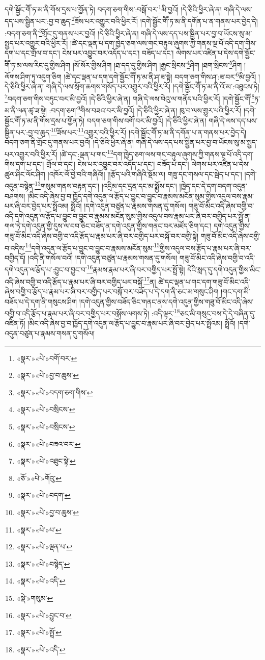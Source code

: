 དགེ་སྦྱོང་གཽ་ཏ་མ་ནི་གོས་དྲས་པ་གྱོན་ཏེ། བདག་ཅག་གིས་:བསྒོ་བར་\footnote{«སྣར་»«པེ་»བགོ་བར་}མི་བྱའོ། །དེ་ཅིའི་ཕྱིར་ཞེ་ན། གཞི་དེ་ལས་དད་པས་སྦྱིན་པར་:བྱ་བ་ཆུད་\footnote{«སྣར་»«པེ་»བྱ་བ་ཆུས་}ཟོས་པར་འགྱུར་བའི་ཕྱིར་རོ། །དགེ་སྦྱོང་གཽ་ཏ་མ་ནི་དགོན་པ་ན་གནས་པར་བྱེད་དེ། :བདག་ཅག་ནི་\footnote{«སྣར་»«པེ་»བདག་ཅག་གིས་}གྲོང་དུ་གནས་པར་བྱའོ། །དེ་ཅིའི་ཕྱིར་ཞེ་ན། གཞི་དེ་ལས་དད་པས་སྦྱིན་པར་བྱ་བ་ཡོངས་སུ་མ་སྤྱད་པར་འགྱུར་བའི་ཕྱིར་རོ། །ཚེ་དང་ལྡན་པ་དག་ཁྱེད་ཅག་ལས་གང་བརྟུལ་ཞུགས་ཀྱི་གནས་ལྔ་པོ་འདི་དག་གིས་དག་པ་དང་གྲོལ་བ་དང་། ངེས་པར་འབྱུང་བར་འདོད་པ་དང་། བཟོད་པ་དང་། ལེགས་པར་འཛིན་པ་དེས་དགེ་སྦྱོང་གཽ་ཏ་མ་ལས་རིང་དུ་གྱིས་ཤིག །སོ་སོར་གྱིས་ཤིག །ཐ་དད་དུ་གྱིས་ཤིག །རྒྱང་སྲིངས་\footnote{«སྣར་»«པེ་»བསྲིངས་}ཤིག །ཐག་སྲིངས་\footnote{«སྣར་»«པེ་»བསྲིངས་}ཤིག །ལོགས་ཤིག་ཏུ་འདུག་ཅིག །ཚེ་དང་ལྡན་པ་དག་དགེ་སྦྱོང་གཽ་ཏ་མ་ནི་ཤ་ཟ་སྟེ། བདག་ཅག་གིས་ཤ་:ཟ་བར་\footnote{«སྣར་»«པེ་»བཟའ་བར་}མི་བྱའོ། །དེ་ཅིའི་ཕྱིར་ཞེ་ན། གཞི་དེ་ལས་སྲོག་ཆགས་གསོད་པར་འགྱུར་བའི་ཕྱིར་རོ། །དགེ་སྦྱོང་གཽ་ཏ་མ་ནི་འོ་མ་:འཐུངས་ཏེ། \footnote{«སྣར་»«པེ་»འཐུང་སྟེ་}བདག་ཅག་གིས་བཏུང་བར་མི་བྱའོ། །དེ་ཅིའི་ཕྱིར་ཞེ་ན། གཞི་དེ་ལས་བེའུ་ལ་གནོད་པའི་ཕྱིར་རོ། །དགེ་སྦྱོང་གཽ་\footnote{«ཅོ་»«པེ་»གོའུ་}ཏ་མ་ནི་ལན་ཚྭ་ཟ་སྟེ། :བདག་ཅག་\footnote{«སྣར་»«པེ་»བདག་}གིས་བཟའ་བར་མི་བྱའོ། །དེ་ཅིའི་ཕྱིར་ཞེ་ན། ཁུ་བ་ལས་གྱུར་པའི་ཕྱིར་རོ། །དགེ་སྦྱོང་གཽ་ཏ་མ་ནི་གོས་དྲས་པ་གྱོན་ཏེ། བདག་ཅག་གིས་བགོ་བར་མི་བྱའོ། །དེ་ཅིའི་ཕྱིར་ཞེ་ན། གཞི་དེ་ལས་དད་པས་སྦྱིན་པར་:བྱ་བ་ཆུད་\footnote{«སྣར་»«པེ་»བྱ་བ་ཆུས་}ཟོས་པར་\footnote{«སྣར་»«པེ་»པ་}འགྱུར་བའི་ཕྱིར་རོ། །དགེ་སྦྱོང་གཽ་ཏ་མ་ནི་དགོན་པ་ན་གནས་པར་བྱེད་དེ། བདག་ཅག་ནི་གྲོང་དུ་གནས་པར་བྱའོ། །དེ་ཅིའི་ཕྱིར་ཞེ་ན། གཞི་དེ་ལས་དད་པས་སྦྱིན་པར་བྱ་བ་ཡོངས་སུ་མ་སྤྱད་པར་འགྱུར་བའི་ཕྱིར་རོ། །ཚེ་དང་:ལྡན་པ་གང་\footnote{«སྣར་»«པེ་»ལྡན་པ་}དག་ཁྱེད་ཅག་ལས་གང་བརྟུལ་ཞུགས་ཀྱི་གནས་ལྔ་པོ་འདི་དག་གིས་དག་པ་དང་། གྲོལ་བ་དང་། ངེས་པར་འབྱུང་བར་འདོད་པ་དང་། བཟོད་པ་དང་། ལེགས་པར་འཛིན་པ་དེས་ཚུལ་ཤིང་ལོང་ཤིག །འཁོར་ལོ་བྱེ་བའི་གཞིའོ།། །།རྩོད་པའི་གཞིའི་སྡོམ་ལ། གཟུ་དང་གསལ་དང་སྦེད་པ་དང་། །དགེ་འདུན་བསྙེན་\footnote{«སྣར་»«པེ་»བསྙེད་}གསུམ་གནས་བརྟན་དང་། །འདྲིམ་དང་དྲན་དང་མ་སྨྱོས་དང་། །ཁྱེད་དང་དེ་དག་བདག་འདུན་བཤགས། །མིང་འདི་ཞེས་བྱ་བ་ཁྱོད་དགེ་འདུན་ལ་རྩོད་པ་བྱུང་བ་བྱུང་བ་རྣམས་མངོན་སུམ་གྱིས་འདུལ་བས་རྣམ་པར་ཞི་བར་བྱེད་པར་སྤྲོའམ། སྤྲོའོ། །དགེ་འདུན་བཙུན་པ་རྣམས་གསན་དུ་གསོལ། གཟུ་བོ་མིང་འདི་ཞེས་བགྱི་བ་འདི་དགེ་འདུན་ལ་རྩོད་པ་བྱུང་བ་བྱུང་བ་རྣམས་མངོན་སུམ་གྱིས་འདུལ་བས་རྣམ་པར་ཞི་བར་བགྱིད་པར་སྤྲོ་ན། གལ་ཏེ་དགེ་འདུན་གྱི་དུས་ལ་བབ་ཅིང་བཟོད་ན་དགེ་འདུན་གྱིས་གནང་བར་མཛོད་ཅིག་དང་། དགེ་འདུན་གྱིས་གཟུ་བོ་མིང་འདི་ཞེས་བགྱི་བ་འདི་རྩོད་པ་རྣམ་པར་ཞི་བར་བགྱིད་པར་བསྐོ་བར་བགྱི་སྟེ། གཟུ་བོ་མིང་འདི་ཞེས་བགྱི་བ་འདིས་\footnote{«སྣར་»«པེ་»འདི་}དགེ་འདུན་ལ་རྩོད་པ་བྱུང་བ་བྱུང་བ་རྣམས་མངོན་སུམ་\footnote{«སྡེ་»གསུམ་}གྱིས་འདུལ་བས་རྩོད་པ་རྣམ་པར་ཞི་བར་བགྱིད་དོ། །འདི་ནི་གསོལ་བའོ། །དགེ་འདུན་བཙུན་པ་རྣམས་གསན་དུ་གསོལ། གཟུ་བོ་མིང་འདི་ཞེས་བགྱི་བ་འདི་དགེ་འདུན་ལ་རྩོད་པ་:བྱུང་བ་བྱུང་བ་\footnote{«སྣར་»«པེ་»བྱུང་བ་}རྣམས་རྣམ་པར་ཞི་བར་བགྱིད་པར་སྤྲོ་སྟེ། དེའི་སླད་དུ་དགེ་འདུན་གྱིས་མིང་འདི་ཞེས་བགྱི་བ་འདི་རྩོད་པ་རྣམ་པར་ཞི་བར་བགྱིད་པར་བསྐོ་\footnote{«སྣར་»«པེ་»སྤྲོ་}ན། ཚེ་དང་ལྡན་པ་གང་དག་གཟུ་བོ་མིང་འདི་ཞེས་བགྱི་བ་རྩོད་པ་རྣམ་པར་ཞི་བར་བགྱིད་པར་བསྐོ་བར་བཟོད་པ་དེ་དག་ནི་ཅང་མ་གསུང་ཤིག །གང་དག་མི་བཟོད་པ་དེ་དག་ནི་གསུངས་ཤིག །དགེ་འདུན་གྱིས་བཟོད་ཅིང་གནང་ནས་དགེ་འདུན་གྱིས་གཟུ་བོ་མིང་འདི་ཞེས་བགྱི་བ་འདི་རྩོད་པ་རྣམ་པར་ཞི་བར་བགྱིད་པར་བསྐོས་ལགས་ཏེ། :འདི་ལྟར་\footnote{«སྣར་»«པེ་»འདི་}ཅང་མི་གསུང་བས་དེ་དེ་བཞིན་དུ་འཛིན་ཏོ། །མིང་འདི་ཞེས་བྱ་བ་ཁྱོད་དགེ་འདུན་ལ་རྩོད་པ་བྱུང་བ་རྣམ་པར་ཞི་བར་བྱེད་པར་སྤྲོའམ། སྤྲོའོ། །དགེ་འདུན་བཙུན་པ་རྣམས་གསན་དུ་གསོལ། 